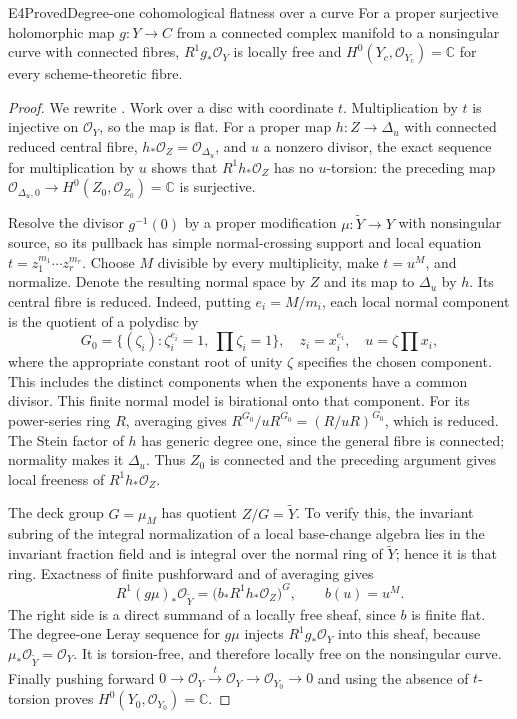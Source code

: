 \begin{statement}{E4}{Proved}{Degree-one cohomological flatness over a curve}
For a proper surjective holomorphic map $g:Y\to C$ from a connected complex
manifold to a nonsingular curve with connected fibres,
$R^1g_*\mathcal O_Y$ is locally free and
$H^0(Y_c,\mathcal O_{Y_c})=\mathbb C$ for every scheme-theoretic fibre.
\end{statement}
\begin{proof}
We rewrite \cite[Theorem labelled \texttt{raynaud}]{Viaclovsky2026Combs}.
Work over a disc with coordinate
$t$. Multiplication by $t$ is injective on $\mathcal O_Y$, so the map
is flat. For a proper map $h:Z\to\Delta_u$ with connected reduced
central fibre, $h_*\mathcal O_Z=\mathcal O_{\Delta_u}$, and $u$ a
nonzero divisor, the exact sequence for multiplication by $u$ shows
that $R^1h_*\mathcal O_Z$ has no $u$-torsion: the preceding map
$\mathcal O_{\Delta_u,0}\to H^0(Z_0,\mathcal O_{Z_0})=\mathbb C$
is surjective.

Resolve the divisor $g^{-1}(0)$ by a proper modification
$\mu:\widetilde Y\to Y$ with nonsingular source, so its pullback has
simple normal-crossing support and local equation
$t=z_1^{m_1}\cdots z_r^{m_r}$. Choose $M$ divisible by every
multiplicity, make $t=u^M$, and normalize. Denote the resulting
normal space by $Z$ and its map to $\Delta_u$ by $h$. Its central
fibre is reduced. Indeed, putting $e_i=M/m_i$, each local normal
component is the quotient of a polydisc by
\[
 G_0=\{(\zeta_i):\zeta_i^{e_i}=1,\ \prod\zeta_i=1\},
 \quad z_i=x_i^{e_i},\quad u=\zeta\prod x_i,
\]
where the appropriate constant root of unity $\zeta$ specifies the
chosen component. This includes the distinct components when the
exponents have a common divisor. This finite normal model is
birational onto that component.
For its power-series ring $R$, averaging gives
$R^{G_0}/uR^{G_0}=(R/uR)^{G_0}$, which is reduced. The Stein factor
of $h$ has generic degree one, since the general fibre is connected;
normality makes it $\Delta_u$. Thus $Z_0$ is connected and the
preceding argument gives local freeness of $R^1h_*\mathcal O_Z$.

The deck group $G=\mu_M$ has quotient $Z/G=\widetilde Y$.
To verify this, the invariant subring of the integral normalization
of a local base-change algebra lies in the invariant fraction field
and is integral over the normal ring of $\widetilde Y$; hence it is
that ring. Exactness of finite pushforward and of averaging gives
\[
 R^1(g\mu)_*\mathcal O_{\widetilde Y}
   =\bigl(b_*R^1h_*\mathcal O_Z\bigr)^G,
 \qquad b(u)=u^M.
\]
The right side is a direct summand of a locally free sheaf, since
$b$ is finite flat. The degree-one Leray sequence for $g\mu$ injects
$R^1g_*\mathcal O_Y$ into this sheaf, because
$\mu_*\mathcal O_{\widetilde Y}=\mathcal O_Y$. It is torsion-free,
and therefore locally free on the nonsingular curve. Finally pushing
forward $0\to\mathcal O_Y\xrightarrow{t}\mathcal O_Y\to
\mathcal O_{Y_0}\to0$ and using the absence of $t$-torsion proves
$H^0(Y_0,\mathcal O_{Y_0})=\mathbb C$.
\end{proof}

